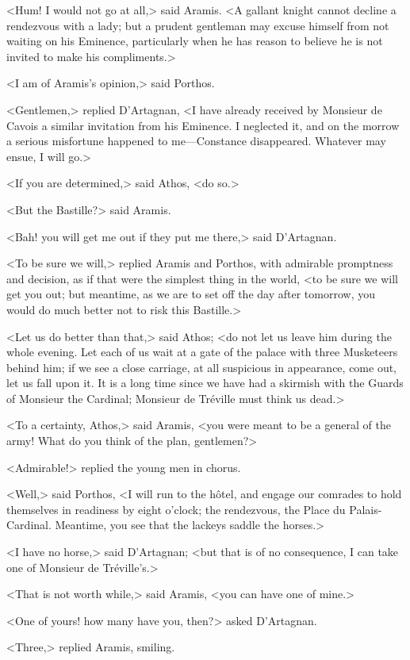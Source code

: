 <Hum! I would not go at all,> said Aramis. <A gallant knight cannot decline a rendezvous with a lady; but a prudent gentleman may excuse himself from not waiting on his Eminence, particularly when he has reason to believe he is not invited to make his compliments.> 

<I am of Aramis's opinion,> said Porthos. 

<Gentlemen,> replied D'Artagnan, <I have already received by Monsieur de Cavois a similar invitation from his Eminence. I neglected it, and on the morrow a serious misfortune happened to me—Constance disappeared. Whatever may ensue, I will go.> 

<If you are determined,> said Athos, <do so.> 

<But the Bastille?> said Aramis. 

<Bah! you will get me out if they put me there,> said D'Artagnan. 

<To be sure we will,> replied Aramis and Porthos, with admirable promptness and decision, as if that were the simplest thing in the world, <to be sure we will get you out; but meantime, as we are to set off the day after tomorrow, you would do much better not to risk this Bastille.> 

<Let us do better than that,> said Athos; <do not let us leave him during the whole evening. Let each of us wait at a gate of the palace with three Musketeers behind him; if we see a close carriage, at all suspicious in appearance, come out, let us fall upon it. It is a long time since we have had a skirmish with the Guards of Monsieur the Cardinal; Monsieur de Tréville must think us dead.> 

<To a certainty, Athos,> said Aramis, <you were meant to be a general of the army! What do you think of the plan, gentlemen?> 

<Admirable!> replied the young men in chorus. 

<Well,> said Porthos, <I will run to the hôtel, and engage our comrades to hold themselves in readiness by eight o'clock; the rendezvous, the Place du Palais-Cardinal. Meantime, you see that the lackeys saddle the horses.> 

<I have no horse,> said D'Artagnan; <but that is of no consequence, I can take one of Monsieur de Tréville's.> 

<That is not worth while,> said Aramis, <you can have one of mine.> 

<One of yours! how many have you, then?> asked D'Artagnan. 

<Three,> replied Aramis, smiling. 

